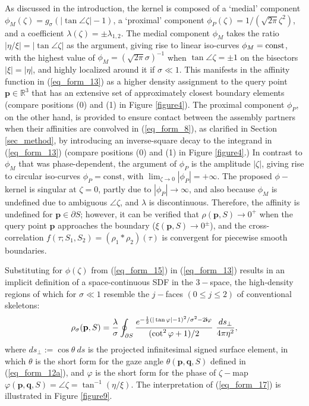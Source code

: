 \documentclass[article]{gmp2014}
\theoremstyle{definition}
\newcommand{\ii}{\text{\textsf{\textbf{i}}}}
\begin{document}
As discussed in the introduction, the kernel is composed of a `medial' component $\phi_M(\zeta) = g_\sigma(|\tan \angle \zeta| - 1)$, a `proximal' component $\phi_P(\zeta) = 1/(\sqrt{2\pi} \zeta^2)$, and a coefficient $\lambda(\zeta) = \pm \lambda_{1,2}$.
%
The medial component $\phi_M$ takes the ratio $|\eta/\xi| = |\tan \angle \zeta|$ as the argument, giving rise to linear iso-curves $\phi_M = \text{\rm const}$, with the highest value of $\phi_M = (\sqrt{2\pi} \sigma)^{-1}$ when $\tan \angle \zeta = \pm 1$ on the bisectors $|\xi| = |\eta|$, and highly localized around it if $\sigma \ll 1$. This manifests in the affinity function in (\ref{eq_form_13}) as a higher density assignment to the query point $\mathbf{p} \in \mathds{R}^3$ that has an extensive set of approximately closest boundary elements (compare positions (0) and (1) in Figure \ref{figure4}).
%
The proximal component $\phi_P$, on the other hand, is provided to ensure contact between the assembly partners when their affinities are convolved in (\ref{eq_form_8}), as clarified in Section \ref{sec_method}, by introducing an inverse-square decay to the integrand in (\ref{eq_form_13}) (compare positions (0) and (1) in Figure \ref{figure4}.) In contrast to $\phi_M$ that was phase-dependent, the argument of $\phi_P$ is the amplitude $|\zeta|$, giving rise to circular iso-curves $\phi_P = \text{const}$, with $\lim_{\zeta \rightarrow 0} |\phi_P| = +\infty$.
%
The proposed $\phi-$kernel is singular at $\zeta = 0$, partly due to $|\phi_P| \rightarrow \infty$, and also because $\phi_M$ is undefined due to ambiguous $\angle \zeta$, and $\lambda$ is discontinuous. Therefore, the affinity is undefined for $\mathbf{p} \in \partial S$; however, it can be verified that $\rho(\mathbf{p}, S) \rightarrow 0^+$ when the query point $\mathbf{p}$ approaches the boundary ($\xi(\mathbf{p}, S) \rightarrow 0^\pm$), and the cross-correlation $f(\tau; S_1, S_2) = (\rho_1 \ast \rho_2) (\tau)$ is convergent for piecewise smooth boundaries.

Substituting for $\phi(\zeta)$ from (\ref{eq_form_15}) in (\ref{eq_form_13}) results in an implicit definition of a space-continuous SDF in the $3-$space, the high-density regions of which for $\sigma \ll 1$ resemble the $j-$faces $(0 \leq j \leq 2)$ of conventional skeletons:
%
\begin{equation}
    \rho_\sigma(\mathbf{p}, S) = \frac{\lambda}{\sigma} \oint_{\partial S} \frac{e^{-\frac{1}{2}(|\tan \varphi| - 1)^2/\sigma^2 - 2 \ii \varphi}}{(\cot^2{\varphi} + 1)/2} ~ \frac{d s_\bot}{4\pi \eta^2}, \label{eq_form_17}
\end{equation}
%
where $d s_\bot := \cos \theta ~ d s$ is the projected infinitesimal signed surface element, in which $\theta$ is the short form for the gaze angle $\theta(\mathbf{p}, \mathbf{q}, S)$ defined in (\ref{eq_form_12a}), and $\varphi$ is the short form for the phase of $\zeta-$map $\varphi(\mathbf{p}, \mathbf{q}, S) = \angle \zeta = \tan^{-1} (\eta/\xi)$. The interpretation of (\ref{eq_form_17}) is illustrated in Figure \ref{figure9}.
\end{document}
